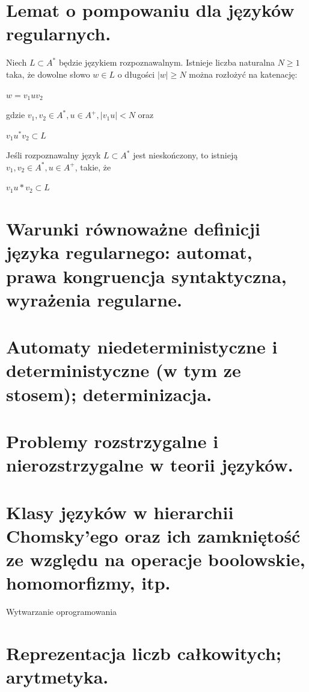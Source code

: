\documentclass[12pt]{article}
\begin{document}
    \section{Lemat o pompowaniu dla języków regularnych.}
    \begin{definition}
    Niech $L \subset A^*$ będzie językiem rozpoznawalnym. Istnieje liczba naturalna $N \geq 1$ taka, że dowolne słowo $w \in L$ o długości $|w| \geq N$ można rozłożyć na katenację:
    \begin{center}
    $w = v_1uv_2$
    \end{center}
    gdzie $v_1, v_2 \in A^*, u \in A^+, |v_1u| < N$ oraz
    \begin{center}
    $v_1u^*v_2 \subset L$
    \end{center}
    \end{definition}
    
    \begin{definition}
    Jeśli rozpoznawalny język $L \subset A^*$ jest nieskończony, to istnieją
    $v_1, v_2 \in A^*, u \in A^+$, takie, że
    \begin{center}
	$v_1u*v_2 \subset L$
    \end{center}
    \end{definition}
    
    
    
    \section{Warunki równoważne definicji języka regularnego: automat, prawa kongruencja syntaktyczna, wyrażenia regularne.}
    \section{Automaty niedeterministyczne i deterministyczne (w tym ze stosem); determinizacja.}
    \section{Problemy rozstrzygalne i nierozstrzygalne w teorii języków.}
    \section{Klasy języków w hierarchii Chomsky’ego oraz ich zamkniętość ze względu na operacje boolowskie, homomorfizmy, itp.}


    {\Large Wytwarzanie oprogramowania}

    \section{Reprezentacja liczb całkowitych; arytmetyka.}
\end{document}
